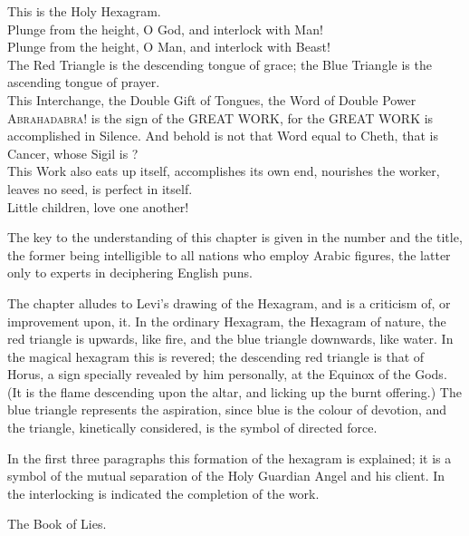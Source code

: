   \begin{Verse}
  This is the Holy Hexagram. \\
  Plunge from the height, O God, and interlock with Man! \\
  Plunge from the height, O Man, and interlock with Beast! \\
  The Red Triangle is the descending tongue of grace; the Blue Triangle is the ascending tongue of prayer. \\
  This Interchange, the Double Gift of Tongues, the Word of Double Power \textemdash{} \textsc{Abrahadabra!} \textemdash{} is the sign of the GREAT WORK, for the GREAT WORK is accomplished in Silence. And behold is not that Word equal to Cheth, that is Cancer, whose Sigil is \cancer{}? \\
  This Work also eats up itself, accomplishes its own end, nourishes the worker, leaves no seed, is perfect in itself. \\
  Little children, love one another! \\
  \end{Verse}
  \pagebreak

  \addchap*{}
  \addsec*{}

  The key to the understanding of this chapter is given in the number and the title, the former being intelligible to all nations who employ Arabic figures, the latter only to experts in deciphering English puns.

  The chapter alludes to Levi's drawing of the Hexagram, and is a criticism of, or improvement upon, it. In the ordinary Hexagram, the Hexagram of nature, the red triangle is upwards, like fire, and the blue triangle downwards, like water.  In the magical hexagram this is revered; the descending red triangle is that of Horus, a sign specially revealed by him personally, at the Equinox of the Gods.  (It is the flame descending upon the altar, and licking up the burnt offering.)  The blue triangle represents the aspiration, since blue is the colour of devotion, and the triangle, kinetically considered, is the symbol of directed force.

  In the first three paragraphs this formation of the hexagram is explained; it is a symbol of the mutual separation of the Holy Guardian Angel and his client. In the interlocking is indicated the completion of the work.

  \textemdash{} The Book of Lies.

  \vspace*{\fill}


